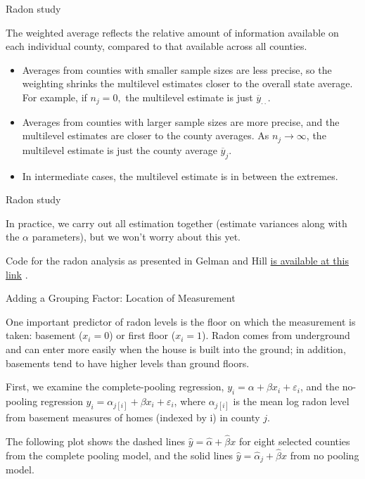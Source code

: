 \documentclass[ignorenonframetext,]{beamer}
\begin{document}
\begin{frame}{Radon study}

The weighted average reflects the relative amount of information
available on each individual county, compared to that available across
all counties.

\begin{itemize}
\item
  Averages from counties with smaller sample sizes are less precise, so
  the weighting shrinks the multilevel estimates closer to the overall
  state average. For example, if \(n_j=0,\) the multilevel estimate is
  just \(\overline{y}_{\cdot \cdot}\).
\item
  Averages from counties with larger sample sizes are more precise, and
  the multilevel estimates are closer to the county averages. As
  \(n_j \rightarrow \infty\), the multilevel estimate is just the county
  average \(\overline{y}_j\).
\item
  In intermediate cases, the multilevel estimate is in between the
  extremes.
\end{itemize}

\end{frame}

\begin{frame}{Radon study}

In practice, we carry out all estimation together (estimate variances
along with the \(\alpha\) parameters), but we won't worry about this
yet.

Code for the radon analysis as presented in Gelman and Hill
\href{http://www.stat.columbia.edu/~gelman/arm/examples/radon/radon_chap12.R}{is
available at this link} .

\end{frame}

\begin{frame}{Adding a Grouping Factor: Location of Measurement}

One important predictor of radon levels is the floor on which the
measurement is taken: basement (\(x_i=0\)) or first floor (\(x_i=1\)).
Radon comes from underground and can enter more easily when the house is
built into the ground; in addition, basements tend to have higher levels
than ground floors.

First, we examine the complete-pooling regression,
\(y_i=\alpha+\beta x_i + \varepsilon_i\), and the no-pooling regression
\(y_i=\alpha_{j[i]}+\beta x_i + \varepsilon_i\), where \(\alpha_{j[i]}\)
is the mean log radon level from basement measures of homes (indexed by
i) in county \(j\).

The following plot shows the dashed lines
\(\widehat{y}=\widehat{\alpha}+\widehat{\beta} x\) for eight selected
counties from the complete pooling model, and the solid lines
\(\widehat{y}=\widehat{\alpha}_j+\widehat{\beta}x\) from no pooling
model.

\end{frame}
\end{document}
